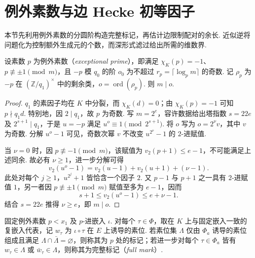 \section{例外素数与边 Hecke 初等因子}
\label{sec:a-hecke}

本节先利用例外素数的分圆阶构造完整标记，再估计边限制配对的余长. 近似逆将问题化为控制额外生成元的个数，而深形式滤过给出所需的维数界.

\begin{lemma}[例外素数的分圆阶]
\label{lem:a-exceptional-order}
\emitthmsource
设素数 $p$ 为例外素数（\emph{exceptional prime}），即满足 $\chi_K(p)=-1$、$p\not\equiv\pm1\pmod m$，且 $-p$ 模 $q_0$ 的阶 $o_0$ 为不超过 $r_p=\lceil\log_p m\rceil$ 的奇数. 记 $\rho_p$ 为 $-p$ 在 $(\mathbb Z/q_1)^\times$ 中的剩余类，$o=\operatorname{ord}(\rho_p)$. 则 $m\mid o$.
\end{lemma}
\begin{proof}
$q_1$ 的素因子均在 $K$ 中分裂，而 $\chi_K(d)=0$；由 $\chi_K(p)=-1$ 可知 $p\nmid q_1d$. 特别地，因 $2\mid q_1$，故 $p$ 为奇数. 写 $m=2^e$，容许数据给出塔指数 $s=22e$ 及 $2^{s+1}\mid q_1$，于是 $u=-p$ 满足 $u^o\equiv1\pmod{2^{s+1}}$. 将 $o$ 写为 $o=2^\nu v$，其中 $v$ 为奇数. 分解 $u^o-1$ 可见，奇数次幂 $v$ 不改变 $u^{2^\nu}-1$ 的 $2$-进赋值.

当 $\nu=0$ 时，因 $p\not\equiv-1\pmod m$，该赋值为 $v_2(p+1)\le e-1$，不可能满足上述同余. 故必有 $\nu\ge1$，进一步分解可得
\[
 v_2(u^o-1)=v_2(u-1)+v_2(u+1)+(\nu-1).
\]
此处对每个 $j\ge1$，$u^{2^j}+1$ 皆恰含一个因子 $2$. 又 $p-1$ 与 $p+1$ 之一具有 $2$-进赋值 $1$，另一者因 $p\not\equiv\pm1\pmod m$ 赋值至多为 $e-1$，因而
\[
 s+1\le v_2(u^o-1)\le e+\nu-1.
\]
结合 $s=22e$ 推得 $\nu\ge e$，即 $m\mid o$.
\end{proof}

固定例外素数 $p<x_1$ 及 $p$-进嵌入 $\iota$. 对每个 $\tau\in\Phi$，取在 $K$ 上与固定嵌入一致的复嵌入代表，记 $w_\tau$ 为 $\iota\circ\tau$ 在 $E$ 上诱导的素位. 若素位集 $\Lambda$ 仅由 $\Phi_a$ 诱导的素位组成且满足 $\Lambda\cap\bar\Lambda=\varnothing$，则称其为 $p$ 处的标记；若进一步对每个 $\tau\in\Phi_a$ 皆有 $w_\tau\in\Lambda$ 或 $\bar w_\tau\in\Lambda$，则称其为完整标记（\emph{full mark}）.

